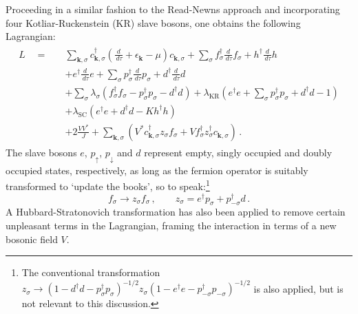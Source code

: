Proceeding in a similar fashion to the Read-Newns approach and incorporating four Kotliar-Ruckenstein (KR) \cite{KotliarRuckenstein} slave bosons, one obtains the following Lagrangian:
\begin{align}
\begin{split}
L \quad = \quad &\sum_{\boldsymbol{k},\sigma} c^{\dagger}_{\boldsymbol{k},\sigma} \left( \frac{d}{\,d\tau} + \epsilon^{}_{\boldsymbol{k}} - \mu \right) c^{}_{\boldsymbol{k},\sigma} + \sum_{\sigma} f^{\dagger}_{\sigma} \frac{d}{\,d\tau} f^{}_{\sigma} + h^{\dagger} \frac{d}{\,d\tau}h \\
&+ e^{\dagger} \frac{d}{\,d\tau} e  + \sum_{\sigma} p^{\dagger}_{\sigma} \frac{d}{\,d\tau} p^{}_{\sigma} + d^{\dagger} \frac{d}{\,d\tau} d\\
&+ \sum_{\sigma} \lambda^{}_{\sigma} (f^{\dagger}_{\sigma} f^{}_{\sigma} - p^{\dagger}_{\sigma} p^{}_{\sigma} - d^{\dagger} d^{} ) + \lambda_{\text{KR}} ( e^{\dagger} e + \sum_{\sigma} p^{\dagger}_{\sigma} p^{}_{\sigma} + d^{\dagger} d - 1)\\
&+\lambda_{\text{SC}} ( e^{\dagger} e + d^{\dagger} d - K h^{\dagger} h)\\
&+ 2 \frac{V V^{\ast}}{J} + \sum_{\boldsymbol{k},\sigma} \left( V^{\ast} c^{\dagger}_{\boldsymbol{k},\sigma} z^{}_{\sigma} f^{}_{\sigma} + V f^{\dagger}_{\sigma} z^{\dagger}_{\sigma} c^{}_{\boldsymbol{k},\sigma} \right) \,.\label{eq:Lagrangian}
\end{split}
\end{align}
The slave bosons $ e $, $ p_{\uparrow} $, $ p_{\downarrow} $ and $ d $ represent empty, singly occupied and doubly occupied states, respectively, as long as the fermion operator is suitably transformed to `update the books', so to speak:\footnote{The conventional transformation $ z^{}_{\sigma} \rightarrow (1 - d^{\dagger} d - p^{\dagger}_{\sigma} p^{}_{\sigma})^{- 1 / 2} z^{}_{\sigma} (1 - e^{\dagger} e - p^{\dagger}_{- \sigma} p^{}_{- \sigma})^{- 1 / 2} $ is also applied, but is not relevant to this discussion.} \begin{equation} f^{}_{\sigma} \rightarrow z^{}_{\sigma} f^{}_{\sigma}\,, \qquad z_{\sigma} = e^{\dagger} p^{}_{\sigma} + p^{\dagger}_{-\sigma} d \,. \end{equation} A Hubbard-Stratonovich transformation has also been applied to remove certain unpleasant terms in the Lagrangian, framing the interaction in terms of a new bosonic field $ V $.


